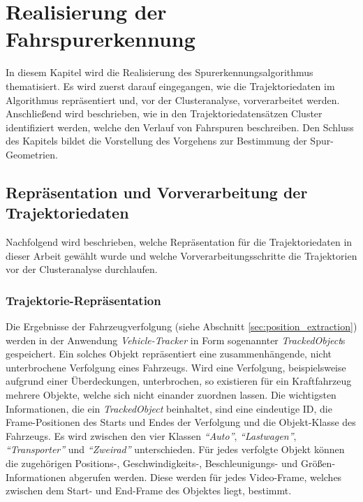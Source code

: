 
\chapter{Realisierung der Fahrspurerkennung}
\label{cha:realisation}

In diesem Kapitel wird die Realisierung des Spurerkennungsalgorithmus thematisiert.
Es wird zuerst darauf eingegangen, wie die Trajektoriedaten im Algorithmus repräsentiert
und, vor der Clusteranalyse, vorverarbeitet werden.
Anschließend wird beschrieben, wie in den Trajektoriedatensätzen Cluster identifiziert werden,
welche den Verlauf von Fahrspuren beschreiben.
Den Schluss des Kapitels bildet die Vorstellung des Vorgehens zur Bestimmung der Spur-Geometrien.

\section{Repräsentation und Vorverarbeitung der Trajektoriedaten}
\label{cha:realisation_clustering}

Nachfolgend wird beschrieben, welche Repräsentation für die Trajektoriedaten in dieser Arbeit gewählt
wurde und welche Vorverarbeitungsschritte die Trajektorien vor der Clusteranalyse durchlaufen.

\subsection{Trajektorie-Repräsentation}

Die Ergebnisse der Fahrzeugverfolgung (siehe Abschnitt \ref{sec:position_extraction}) werden
in der Anwendung \textit{Vehicle-Tracker} in Form sogenannter \textit{TrackedObject}s gespeichert.
Ein solches Objekt repräsentiert eine zusammenhängende, nicht unterbrochene Verfolgung eines Fahrzeugs.
Wird eine Verfolgung, beispielsweise aufgrund einer Überdeckungen, unterbrochen, so existieren für ein
Kraftfahrzeug mehrere Objekte, welche sich nicht einander zuordnen lassen.
Die wichtigsten Informationen, die ein \textit{TrackedObject} beinhaltet, sind eine eindeutige ID,
die Frame-Positionen des Starts und Endes der Verfolgung und die Objekt-Klasse des Fahrzeugs. Es wird
zwischen den vier Klassen \textit{``Auto''}, \textit{``Lastwagen''}, \textit{``Transporter''}
und \textit{``Zweirad''} unterschieden.
Für jedes verfolgte Objekt können die zugehörigen Positions-, Geschwindigkeits-, Beschleunigungs-
und Größen-Informationen abgerufen werden. Diese werden für jedes Video-Frame, welches zwischen dem Start-
und End-Frame des Objektes liegt, bestimmt.

